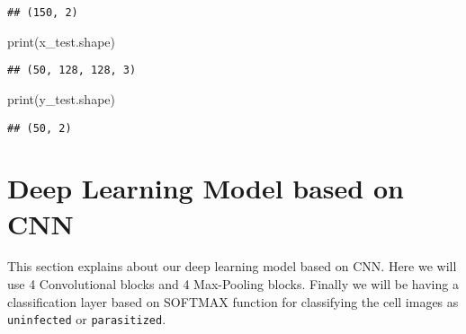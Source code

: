 \documentclass[]{book}
\newenvironment{Shaded}{\begin{snugshade}}{\end{snugshade}}
\newcommand{\BuiltInTok}[1]{#1}
\newcommand{\NormalTok}[1]{#1}
\begin{document}
\begin{verbatim}
## (150, 2)
\end{verbatim}

\begin{Shaded}
\begin{Highlighting}[]
\BuiltInTok{print}\NormalTok{(x_test.shape)}
\end{Highlighting}
\end{Shaded}

\begin{verbatim}
## (50, 128, 128, 3)
\end{verbatim}

\begin{Shaded}
\begin{Highlighting}[]
\BuiltInTok{print}\NormalTok{(y_test.shape)}
\end{Highlighting}
\end{Shaded}

\begin{verbatim}
## (50, 2)
\end{verbatim}

\hypertarget{deep-learning-model-based-on-cnn}{%
\section{Deep Learning Model based on CNN}\label{deep-learning-model-based-on-cnn}}

This section explains about our deep learning model based on CNN. Here we will use 4 Convolutional blocks and 4 Max-Pooling blocks. Finally we will be having a classification layer based on SOFTMAX function for classifying the cell images as \texttt{uninfected} or \texttt{parasitized}.
\end{document}
